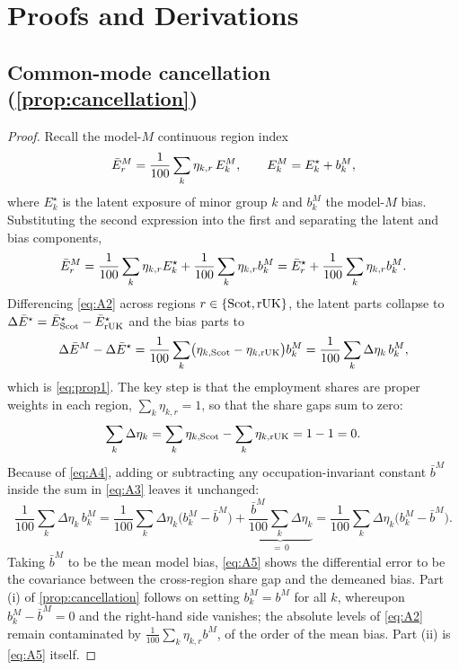 \section{Proofs and Derivations}\label{app:proofs}

\subsection{Common-mode cancellation (\texorpdfstring{\cref{prop:cancellation}}{Proposition 1})}

\begin{proof}
Recall the model-$M$ continuous region index
\begin{equation}\label{eq:A1}
\bar{E}^{M}_r = \frac{1}{100} \sum_k \eta_{k,r}\, E^{M}_k , \qquad
E^{M}_k = E^{\star}_k + b^{M}_k ,
\end{equation}
where $E^{\star}_k$ is the latent exposure of minor group $k$ and $b^{M}_k$ the model-$M$ bias. Substituting the second expression into the first and separating the latent and bias components,
\begin{equation}\label{eq:A2}
\bar{E}^{M}_r = \frac{1}{100} \sum_k \eta_{k,r} E^{\star}_k + \frac{1}{100} \sum_k \eta_{k,r} b^{M}_k = \bar{E}^{\star}_r + \frac{1}{100} \sum_k \eta_{k,r} b^{M}_k .
\end{equation}
Differencing \cref{eq:A2} across regions $r \in \{\mathrm{Scot}, \mathrm{rUK}\}$, the latent parts collapse to $\Delta\bar{E}^{\star} = \bar{E}^{\star}_{\mathrm{Scot}} - \bar{E}^{\star}_{\mathrm{rUK}}$ and the bias parts to
\begin{equation}\label{eq:A3}
\Delta\bar{E}^{M} - \Delta\bar{E}^{\star} = \frac{1}{100} \sum_k \bigl(\eta_{k,\mathrm{Scot}} - \eta_{k,\mathrm{rUK}}\bigr) b^{M}_k = \frac{1}{100} \sum_k \Delta\eta_k\, b^{M}_k ,
\end{equation}
which is \cref{eq:prop1}. The key step is that the employment shares are proper weights in each region, $\sum_k \eta_{k,r} = 1$, so that the share gaps sum to zero:
\begin{equation}\label{eq:A4}
\sum_k \Delta\eta_k = \sum_k \eta_{k,\mathrm{Scot}} - \sum_k \eta_{k,\mathrm{rUK}} = 1 - 1 = 0 .
\end{equation}
Because of \cref{eq:A4}, adding or subtracting any occupation-invariant constant $\bar{b}^{M}$ inside the sum in \cref{eq:A3} leaves it unchanged:
\begin{equation}\label{eq:A5}
\frac{1}{100} \sum_k \Delta\eta_k\, b^{M}_k
= \frac{1}{100} \sum_k \Delta\eta_k
\bigl(b^{M}_k - \bar{b}^{M}\bigr)
+ \underbrace{\frac{\bar{b}^{M}}{100} \sum_k
\Delta\eta_k}_{=\,0}
= \frac{1}{100} \sum_k \Delta\eta_k
\bigl(b^{M}_k - \bar{b}^{M}\bigr) .
\end{equation}
Taking $\bar{b}^{M}$ to be the mean model bias, \cref{eq:A5} shows the differential error to be the covariance between the cross-region share gap and the demeaned bias. Part (i) of \cref{prop:cancellation} follows on setting $b^{M}_k = b^{M}$ for all $k$, whereupon $b^{M}_k - \bar{b}^{M} = 0$ and the right-hand side vanishes; the absolute levels of \cref{eq:A2} remain contaminated by $\tfrac{1}{100}\sum_k \eta_{k,r} b^{M}$, of the order of the mean bias. Part (ii) is \cref{eq:A5} itself.
\end{proof}

